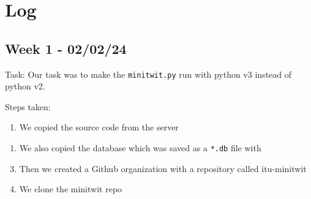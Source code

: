 \section{Log}
\label{appendix_log}

\subsection{Week 1 - 02/02/24}
\label{log:week1}

Task: Our task was to make the \texttt{minitwit.py} run with python v3
instead of python v2.

Steps taken:

\begin{enumerate}
    \item We copied the source code from the server
\end{enumerate}


\begin{enumerate}
    \item We also copied the database which was saved as a \texttt{*.db} file with
\end{enumerate}


\begin{enumerate}
    \setcounter{enumi}{2}
    \item Then we created a Github organization with a repository called itu-minitwit
    \item We clone the minitwit repo
\end{enumerate}



